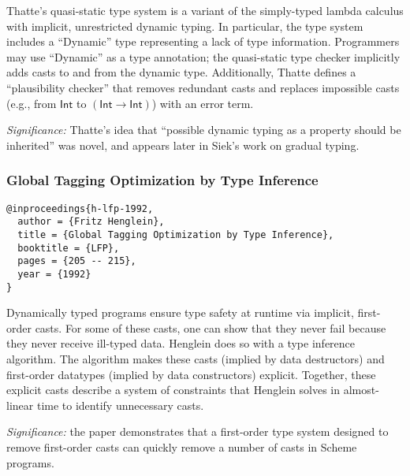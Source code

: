 \documentclass{article}
\begin{document}
Thatte's quasi-static type system is a variant of the simply-typed lambda
calculus with implicit, unrestricted dynamic typing.
In particular, the type system includes a ``Dynamic'' type representing a lack
of type information.
Programmers may use ``Dynamic'' as a type annotation; the quasi-static type
checker implicitly adds casts to and from the dynamic type.
Additionally, Thatte defines a ``plausibility checker'' that removes redundant
casts and replaces impossible casts (e.g., from $\mathsf{Int}$ to
$\mathsf{(Int \rightarrow Int)}$) with an error term.


\emph{Significance:} Thatte's idea that ``possible dynamic typing as a property
should be inherited'' was novel, and appears later in Siek's work on gradual
typing.


\newpage
\subsubsection*{Global Tagging Optimization by Type Inference}
\begin{verbatim}
@inproceedings{h-lfp-1992,
  author = {Fritz Henglein},
  title = {Global Tagging Optimization by Type Inference},
  booktitle = {LFP},
  pages = {205 -- 215},
  year = {1992}
}
\end{verbatim}

Dynamically typed programs ensure type safety at runtime via implicit,
first-order casts.
For some of these casts, one can show that they never fail because they never
receive ill-typed data.
Henglein does so with a type inference algorithm.
The algorithm makes these casts (implied by data destructors) and first-order
datatypes (implied by data constructors) explicit.
Together, these explicit casts describe a system of constraints that Henglein
solves in almost-linear time to identify unnecessary casts.


\emph{Significance:} the paper demonstrates that a first-order type system
designed to remove first-order casts can quickly remove a number of casts in
Scheme programs.
\end{document}
